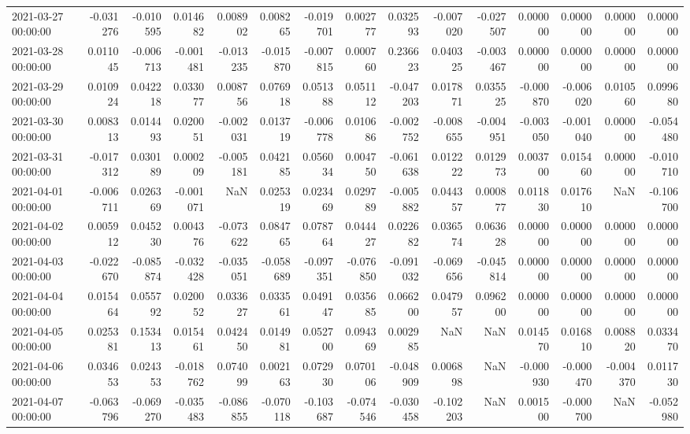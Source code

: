 \begin{tabular}{lrrrrrrrrrrrrrr}
2021-03-27 00:00:00 & -0.031276 & -0.010595 & 0.014682 & 0.008902 & 0.008265 & -0.019701 & 0.002777 & 0.032593 & -0.007020 & -0.027507 & 0.000000 & 0.000000 & 0.000000 & 0.000000 \\
2021-03-28 00:00:00 & 0.011045 & -0.006713 & -0.001481 & -0.013235 & -0.015870 & -0.007815 & 0.000760 & 0.236623 & 0.040325 & -0.003467 & 0.000000 & 0.000000 & 0.000000 & 0.000000 \\
2021-03-29 00:00:00 & 0.010924 & 0.042218 & 0.033077 & 0.008756 & 0.076918 & 0.051388 & 0.051112 & -0.047203 & 0.017871 & 0.035525 & -0.000870 & -0.006020 & 0.010560 & 0.099680 \\
2021-03-30 00:00:00 & 0.008313 & 0.014493 & 0.020051 & -0.002031 & 0.013719 & -0.006778 & 0.010686 & -0.002752 & -0.008655 & -0.004951 & -0.003050 & -0.001040 & 0.000000 & -0.054480 \\
2021-03-31 00:00:00 & -0.017312 & 0.030189 & 0.000209 & -0.005181 & 0.042185 & 0.056034 & 0.004750 & -0.061638 & 0.012222 & 0.012973 & 0.003700 & 0.015460 & 0.000000 & -0.010710 \\
2021-04-01 00:00:00 & -0.006711 & 0.026369 & -0.001071 & NaN & 0.025319 & 0.023469 & 0.029789 & -0.005882 & 0.044357 & 0.000877 & 0.011830 & 0.017610 & NaN & -0.106700 \\
2021-04-02 00:00:00 & 0.005912 & 0.045230 & 0.004376 & -0.073622 & 0.084765 & 0.078764 & 0.044427 & 0.022682 & 0.036574 & 0.063628 & 0.000000 & 0.000000 & 0.000000 & 0.000000 \\
2021-04-03 00:00:00 & -0.022670 & -0.085874 & -0.032428 & -0.035051 & -0.058689 & -0.097351 & -0.076850 & -0.091032 & -0.069656 & -0.045814 & 0.000000 & 0.000000 & 0.000000 & 0.000000 \\
2021-04-04 00:00:00 & 0.015464 & 0.055792 & 0.020052 & 0.033627 & 0.033561 & 0.049147 & 0.035685 & 0.066200 & 0.047957 & 0.096200 & 0.000000 & 0.000000 & 0.000000 & 0.000000 \\
2021-04-05 00:00:00 & 0.025381 & 0.153413 & 0.015461 & 0.042450 & 0.014981 & 0.052700 & 0.094369 & 0.002985 & NaN & NaN & 0.014570 & 0.016810 & 0.008820 & 0.033470 \\
2021-04-06 00:00:00 & 0.034653 & 0.024353 & -0.018762 & 0.074099 & 0.002163 & 0.072930 & 0.070106 & -0.048909 & 0.006898 & NaN & -0.000930 & -0.000470 & -0.004370 & 0.011730 \\
2021-04-07 00:00:00 & -0.063796 & -0.069270 & -0.035483 & -0.086855 & -0.070118 & -0.103687 & -0.074546 & -0.030458 & -0.102203 & NaN & 0.001500 & -0.000700 & NaN & -0.052980 \\

\end{tabular}
